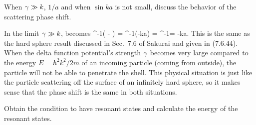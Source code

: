 \begin{problem}
	When $\gamma \gg k$, $1/a$ and when $\sin ka$ is not small, discuss the behavior of the scattering phase shift.
\end{problem}

\begin{solution}
	In the limit $\gamma \gg k$,  becomes
	\beq
		\delo \to \tan^{-1}\!\!\left( - \right)
		= \tan^{-1}(-\cot ka)
		= \tan^{-1}\!
		= -ka.
	\eeq
	This is the same as the hard sphere result discussed in Sec.~7.6 of Sakurai and given in (7.6.44).  When the delta function potential's strength $\gamma$ becomes very large compared to the energy $E = \hbar^2 k^2 / 2m$ of an incoming particle (coming from outside), the particle will not be able to penetrate the shell.  This physical situation is just like the particle scattering off the surface of an infinitely hard sphere, so it makes sense that the phase shift is the same in both situations.
\end{solution}



\begin{problem}
	Obtain the condition to have resonant states and calculate the energy of the resonant states.
\end{problem}

